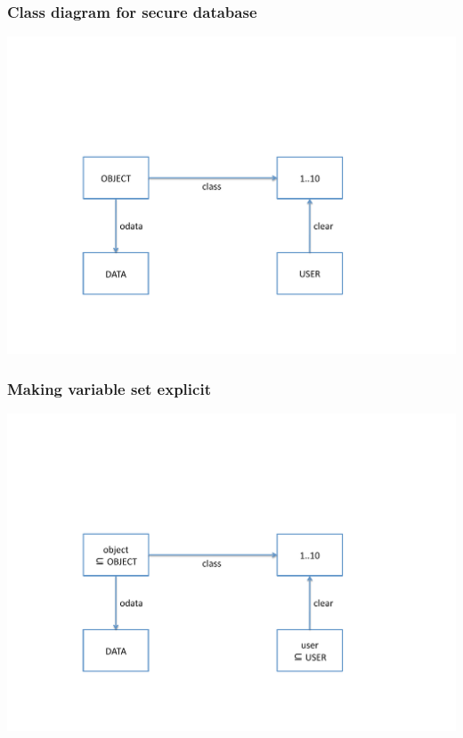 \documentclass{beamer}
\begin{document}
\begin{frame} \frametitle{Class diagram for secure database}

  \begin{center}
    \includegraphics[scale=.5]{sdb1}
  \end{center}

\end{frame}





\begin{frame} \frametitle{Making variable set explicit}

  \begin{center}
    \includegraphics[scale=.5]{sdb2}
  \end{center}

\end{frame}
\end{document}
